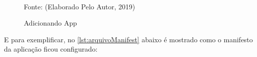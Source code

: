 \begin{figure}[!htpb]
	\centering
	\caption{Adicionando App}
	\\
	{\footnotesize Fonte: (Elaborado Pelo Autor, 2019)}
	\label{f_c4_pwa_custom}
\end{figure}

E para exemplificar, no \autoref{lst:arquivoManifest} abaixo é mostrado como o manifesto da aplicação ficou configurado:

